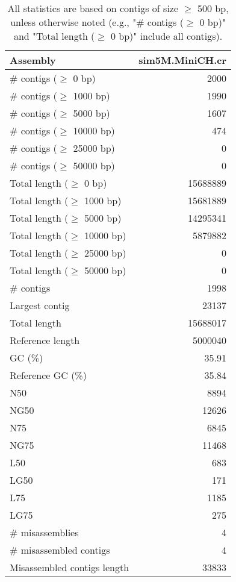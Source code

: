 \documentclass[12pt,a4paper]{article}
\begin{document}
\begin{table}[ht]
\begin{center}
\caption{All statistics are based on contigs of size $\geq$ 500 bp, unless otherwise noted (e.g., "\# contigs ($\geq$ 0 bp)" and "Total length ($\geq$ 0 bp)" include all contigs).}
\begin{tabular}{|l*{1}{|r}|}
\hline
Assembly & sim5M.MiniCH.cr \\ \hline
\# contigs ($\geq$ 0 bp) & 2000 \\ \hline
\# contigs ($\geq$ 1000 bp) & 1990 \\ \hline
\# contigs ($\geq$ 5000 bp) & 1607 \\ \hline
\# contigs ($\geq$ 10000 bp) & 474 \\ \hline
\# contigs ($\geq$ 25000 bp) & 0 \\ \hline
\# contigs ($\geq$ 50000 bp) & 0 \\ \hline
Total length ($\geq$ 0 bp) & 15688889 \\ \hline
Total length ($\geq$ 1000 bp) & 15681889 \\ \hline
Total length ($\geq$ 5000 bp) & 14295341 \\ \hline
Total length ($\geq$ 10000 bp) & 5879882 \\ \hline
Total length ($\geq$ 25000 bp) & 0 \\ \hline
Total length ($\geq$ 50000 bp) & 0 \\ \hline
\# contigs & 1998 \\ \hline
Largest contig & 23137 \\ \hline
Total length & 15688017 \\ \hline
Reference length & 5000040 \\ \hline
GC (\%) & 35.91 \\ \hline
Reference GC (\%) & 35.84 \\ \hline
N50 & 8894 \\ \hline
NG50 & 12626 \\ \hline
N75 & 6845 \\ \hline
NG75 & 11468 \\ \hline
L50 & 683 \\ \hline
LG50 & 171 \\ \hline
L75 & 1185 \\ \hline
LG75 & 275 \\ \hline
\# misassemblies & 4 \\ \hline
\# misassembled contigs & 4 \\ \hline
Misassembled contigs length & 33833 \\ \hline

\end{tabular}
\end{center}
\end{table}
\end{document}
